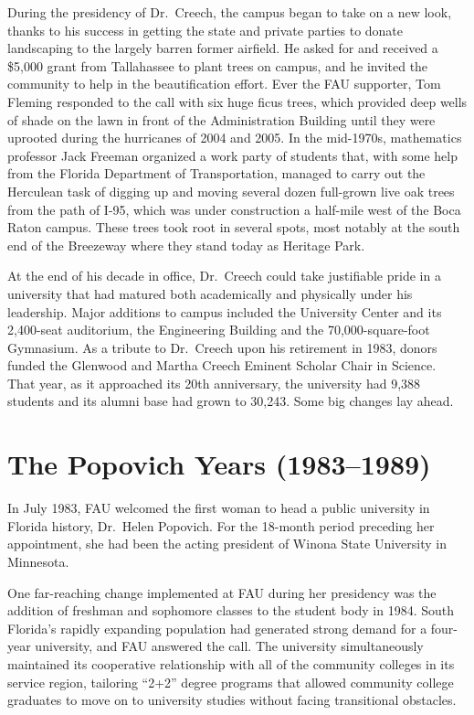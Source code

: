 \documentclass[phd, 12pt, print]{fauthesis}
\begin{document}
During the presidency of Dr.\ Creech, the campus began to take on a new look, thanks to his success in getting the state and private parties to donate landscaping to the largely barren former airfield.  He asked for and received a \$5,000 grant from Tallahassee to plant trees on campus, and he invited the community to help in the beautification effort.  Ever the FAU supporter, Tom Fleming responded to the call with six huge ficus trees, which provided deep wells of shade on the lawn in front of the Administration Building until they were uprooted during the hurricanes of 2004 and 2005.  In the mid-1970s, mathematics professor Jack Freeman organized a work party of students that, with some help from the Florida Department of Transportation, managed to carry out the Herculean task of digging up and moving several dozen full-grown live oak trees from the path of I-95, which was under construction a half-mile west of the Boca Raton campus.  These trees took root in several spots, most notably at the south end of the Breezeway where they stand today as Heritage Park.

At the end of his decade in office, Dr.\ Creech could take justifiable pride in a university that had matured both academically and physically under his leadership.  Major additions to campus included the University Center and its 2,400-seat auditorium, the Engineering Building and the 70,000-square-foot Gymnasium.  As a tribute to Dr.\ Creech upon his retirement in 1983, donors funded the Glenwood and Martha Creech Eminent Scholar Chair in Science.  That year, as it approached its 20th anniversary, the university had 9,388 students and its alumni base had grown to 30,243.  Some big changes lay ahead.

\section{The Popovich Years (1983--1989)}

In July 1983, FAU welcomed the first woman to head a public university in Florida history, Dr.\ Helen Popovich. For the 18-month period preceding her appointment, she had been the acting president of Winona State University in Minnesota.

One far-reaching change implemented at FAU during her presidency was the addition of freshman and sophomore classes to the student body in 1984.  South Florida's rapidly expanding population had generated strong demand for a four-year university, and FAU answered the call.  The university simultaneously maintained its cooperative relationship with all of the community colleges in its service region, tailoring ``2+2'' degree programs that allowed community college graduates to move on to university studies without facing transitional obstacles.
\end{document}
